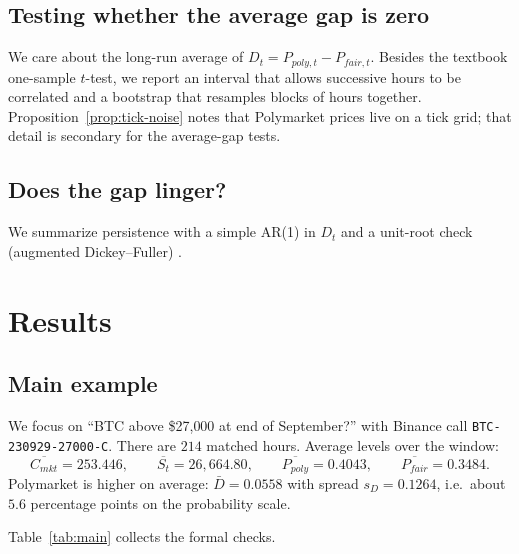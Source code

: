 \documentclass[11pt]{article}
\numberwithin{equation}{section}
\theoremstyle{plain}
\begin{document}
\subsection{Testing whether the average gap is zero}
We care about the long-run average of $D_t=P_{poly,t}-P_{fair,t}$. Besides the textbook one-sample $t$-test, we report an interval that allows successive hours to be correlated \citep{newey1987} and a bootstrap that resamples blocks of hours together. Proposition~\ref{prop:tick-noise} notes that Polymarket prices live on a tick grid; that detail is secondary for the average-gap tests.

\subsection{Does the gap linger?}
We summarize persistence with a simple AR(1) in $D_t$ and a unit-root check (augmented Dickey--Fuller) \citep{dickey1979}.

\section{Results}
\subsection{Main example}
We focus on ``BTC above \$27{,}000 at end of September?'' with Binance call \texttt{BTC-230929-27000-C}. There are $214$ matched hours. Average levels over the window:
\[
\overline{C_{mkt}} = 253.446,
\qquad
\overline{S_t} = 26{,}664.80,
\qquad
\overline{P_{poly}} = 0.4043,
\qquad
\overline{P_{fair}} = 0.3484.
\]
Polymarket is higher on average: $\bar{D}=0.0558$ with spread $s_D=0.1264$, i.e.\ about $5.6$ percentage points on the probability scale.

Table~\ref{tab:main} collects the formal checks.
\end{document}
